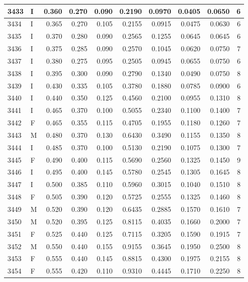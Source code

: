 \documentclass[9pt,twocolumn,twoside,]{pnas-new}
\begin{document}
\begin{tabular}{l|l|r|r|r|r|r|r|r|r}
\hline
3433 & I & 0.360 & 0.270 & 0.090 & 0.2190 & 0.0970 & 0.0405 & 0.0650 & 6\\
\hline
3434 & I & 0.365 & 0.270 & 0.105 & 0.2155 & 0.0915 & 0.0475 & 0.0630 & 6\\
\hline
3435 & I & 0.370 & 0.280 & 0.090 & 0.2565 & 0.1255 & 0.0645 & 0.0645 & 6\\
\hline
3436 & I & 0.375 & 0.285 & 0.090 & 0.2570 & 0.1045 & 0.0620 & 0.0750 & 7\\
\hline
3437 & I & 0.380 & 0.275 & 0.095 & 0.2505 & 0.0945 & 0.0655 & 0.0750 & 6\\
\hline
3438 & I & 0.395 & 0.300 & 0.090 & 0.2790 & 0.1340 & 0.0490 & 0.0750 & 8\\
\hline
3439 & I & 0.430 & 0.335 & 0.105 & 0.3780 & 0.1880 & 0.0785 & 0.0900 & 6\\
\hline
3440 & I & 0.440 & 0.350 & 0.125 & 0.4560 & 0.2100 & 0.0955 & 0.1310 & 8\\
\hline
3441 & I & 0.465 & 0.370 & 0.100 & 0.5055 & 0.2340 & 0.1100 & 0.1400 & 7\\
\hline
3442 & F & 0.465 & 0.355 & 0.115 & 0.4705 & 0.1955 & 0.1180 & 0.1260 & 7\\
\hline
3443 & M & 0.480 & 0.370 & 0.130 & 0.6430 & 0.3490 & 0.1155 & 0.1350 & 8\\
\hline
3444 & I & 0.485 & 0.370 & 0.100 & 0.5130 & 0.2190 & 0.1075 & 0.1300 & 7\\
\hline
3445 & F & 0.490 & 0.400 & 0.115 & 0.5690 & 0.2560 & 0.1325 & 0.1450 & 9\\
\hline
3446 & I & 0.495 & 0.400 & 0.145 & 0.5780 & 0.2545 & 0.1305 & 0.1645 & 8\\
\hline
3447 & I & 0.500 & 0.385 & 0.110 & 0.5960 & 0.3015 & 0.1040 & 0.1510 & 8\\
\hline
3448 & F & 0.505 & 0.390 & 0.120 & 0.5725 & 0.2555 & 0.1325 & 0.1460 & 8\\
\hline
3449 & M & 0.520 & 0.390 & 0.120 & 0.6435 & 0.2885 & 0.1570 & 0.1610 & 7\\
\hline
3450 & M & 0.520 & 0.395 & 0.125 & 0.8115 & 0.4035 & 0.1660 & 0.2000 & 7\\
\hline
3451 & F & 0.525 & 0.440 & 0.125 & 0.7115 & 0.3205 & 0.1590 & 0.1915 & 7\\
\hline
3452 & M & 0.550 & 0.440 & 0.155 & 0.9155 & 0.3645 & 0.1950 & 0.2500 & 8\\
\hline
3453 & F & 0.555 & 0.440 & 0.145 & 0.8815 & 0.4300 & 0.1975 & 0.2155 & 8\\
\hline
3454 & F & 0.555 & 0.420 & 0.110 & 0.9310 & 0.4445 & 0.1710 & 0.2250 & 8\\

\end{tabular}
\end{document}
